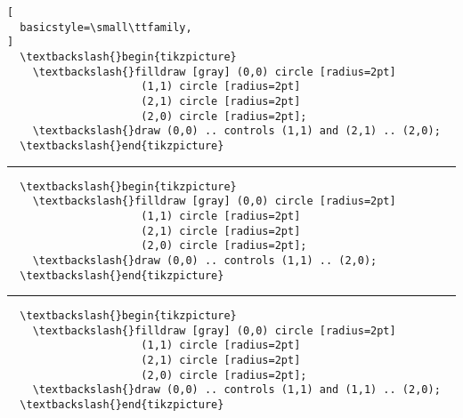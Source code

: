 \documentclass{article}
\begin{document}
\lstset{
  language=TeX,
  basicstyle=\ttfamily,
}
\noindent
\begin{lstlisting}[
  basicstyle=\small\ttfamily,
]
  \textbackslash{}begin{tikzpicture}
    \textbackslash{}filldraw [gray] (0,0) circle [radius=2pt]
                     (1,1) circle [radius=2pt]
                     (2,1) circle [radius=2pt]
                     (2,0) circle [radius=2pt];
    \textbackslash{}draw (0,0) .. controls (1,1) and (2,1) .. (2,0);
  \textbackslash{}end{tikzpicture}
\end{lstlisting}

\vspace{1em}


\noindent \rule{\paperwidth}{1pt}
\vspace{2em}


\noindent
\begin{lstlisting}
  \textbackslash{}begin{tikzpicture}
    \textbackslash{}filldraw [gray] (0,0) circle [radius=2pt]
                     (1,1) circle [radius=2pt]
                     (2,1) circle [radius=2pt]
                     (2,0) circle [radius=2pt];
    \textbackslash{}draw (0,0) .. controls (1,1) .. (2,0);
  \textbackslash{}end{tikzpicture}
\end{lstlisting}
\vspace{3em}


\noindent \rule{\paperwidth}{1pt}
\vspace{2em}


\noindent
\begin{lstlisting}
  \textbackslash{}begin{tikzpicture}
    \textbackslash{}filldraw [gray] (0,0) circle [radius=2pt]
                     (1,1) circle [radius=2pt]
                     (2,1) circle [radius=2pt]
                     (2,0) circle [radius=2pt];
    \textbackslash{}draw (0,0) .. controls (1,1) and (1,1) .. (2,0);
  \textbackslash{}end{tikzpicture}
\end{lstlisting}
\vspace{2em}
\end{document}
